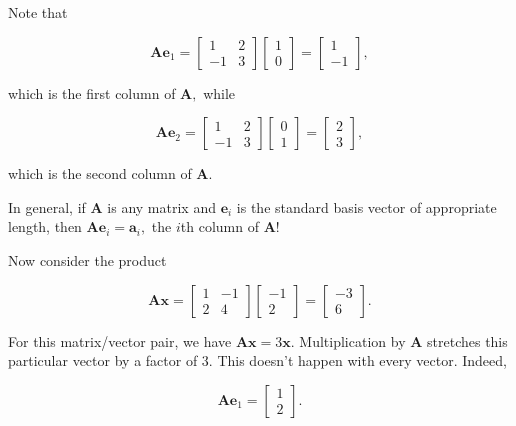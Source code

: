 \documentclass[
]{book}
\theoremstyle{definition}
\theoremstyle{definition}
\theoremstyle{definition}
\theoremstyle{definition}
\theoremstyle{remark}
\begin{document}
Note that

\[\mathbf{A}\mathbf{e}_1=\begin{bmatrix} 1 & 2 \\-1 & 3\end{bmatrix}\begin{bmatrix}1\\0\end{bmatrix}=\begin{bmatrix}1\\-1\end{bmatrix},\]

which is the first column of \(\mathbf{A},\) while

\[\mathbf{A}\mathbf{e}_2=\begin{bmatrix} 1 & 2 \\-1 & 3\end{bmatrix}\begin{bmatrix}0\\1\end{bmatrix}=\begin{bmatrix}2\\3\end{bmatrix},\]

which is the second column of \(\mathbf{A}.\)

In general, if \(\mathbf{A}\) is any matrix and \(\mathbf{e}_i\) is the standard basis vector of appropriate length, then \(\mathbf{A}\mathbf{e}_i=\mathbf{a}_i,\) the \(i\)th column of \(\mathbf{A}\)!

Now consider the product

\[\mathbf{A}\mathbf{x}=\begin{bmatrix}1& -1\\2&4\end{bmatrix}\begin{bmatrix}-1\\2\end{bmatrix}=\begin{bmatrix}-3\\6\end{bmatrix}.\]

For this matrix/vector pair, we have \(\mathbf{A}\mathbf{x}=3\mathbf{x}.\) Multiplication by \(\mathbf{A}\) stretches this particular vector by a factor of \(3\). This doesn't happen with every vector. Indeed,

\[\mathbf{A}\mathbf{e}_1=\begin{bmatrix}1\\2\end{bmatrix}.\]
\end{document}
